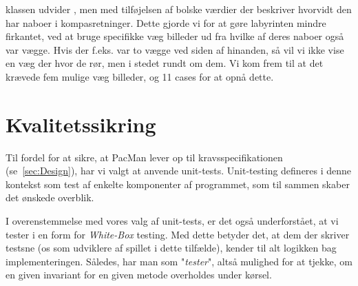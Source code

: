 \documentclass{article}
\newcommand{\class}[1]{\textcolor{BlueViolet}{\small\ttfamily\seqsplit{#1}}}
\theoremstyle{mytheoremstyle}
\theoremstyle{mytheoremstyle}
\theoremstyle{myproblemstyle}
\begin{document}
\class{Wall} klassen udvider \class{Pos2D}, men med tilføjelsen af bolske
værdier der beskriver hvorvidt den har naboer i kompasretninger. Dette gjorde vi
for at gøre labyrinten mindre firkantet, ved at bruge specifikke væg billeder ud
fra hvilke af deres naboer også var vægge. Hvis der f.eks. var to vægge ved
siden af hinanden, så vil vi ikke vise en væg der hvor de rør, men i stedet
rundt om dem. Vi kom frem til at det krævede fem mulige væg billeder, og 11
cases for at opnå dette. 



\section{Kvalitetssikring}\label{sec:Kvalitetssikring} %
Til fordel for at sikre, at PacMan lever op til kravsspecifikationen
(se \autoref{sec:Design}), har vi valgt at anvende unit-tests. Unit-testing
defineres i denne kontekst som test af enkelte komponenter af programmet, som
til sammen skaber det ønskede overblik.

I overenstemmelse med vores valg af unit-tests, er det også underforstået, at vi
tester i en form for \textit{White-Box} testing. Med dette betyder det, at dem der
skriver testsne (os som udviklere af spillet i dette tilfælde), kender til alt
logikken bag implementeringen. Således, har man som "\textit{tester}", altså
mulighed for at tjekke, om en given invariant for en given metode overholdes
under kørsel.
\end{document}
